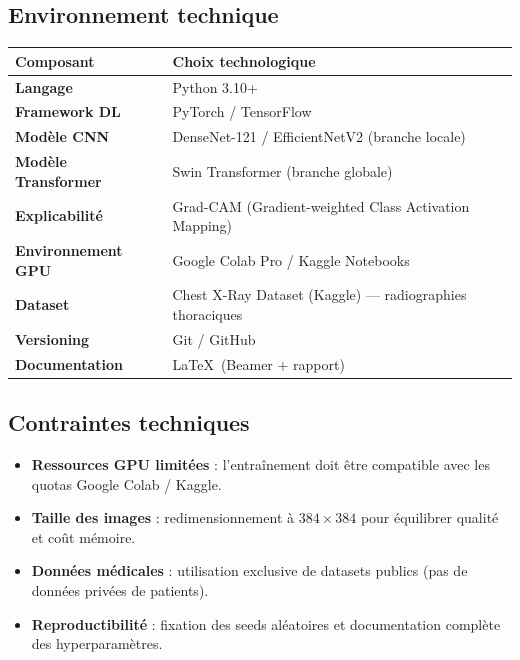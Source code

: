\documentclass[a4paper,12pt]{article}
\begin{document}
\subsection{Environnement technique}

\renewcommand{\arraystretch}{1.35}
\begin{tabularx}{\linewidth}{@{}>{\bfseries}l X@{}}
  \toprule
  \textbf{Composant} & \textbf{Choix technologique} \\
  \midrule
  Langage & Python 3.10+ \\
  \rowcolor{grisClair}
  Framework DL & PyTorch / TensorFlow \\
  Modèle CNN & DenseNet-121 / EfficientNetV2 (branche locale) \\
  \rowcolor{grisClair}
  Modèle Transformer & Swin Transformer (branche globale) \\
  Explicabilité & Grad-CAM (Gradient-weighted Class Activation Mapping) \\
  \rowcolor{grisClair}
  Environnement GPU & Google Colab Pro / Kaggle Notebooks \\
  Dataset & Chest X-Ray Dataset (Kaggle) — radiographies thoraciques \\
  \rowcolor{grisClair}
  Versioning & Git / GitHub \\
  Documentation & \LaTeX\ (Beamer + rapport) \\
  \bottomrule
\end{tabularx}

\subsection{Contraintes techniques}

\begin{itemize}[leftmargin=1.5em, itemsep=4pt]
  \item \textbf{Ressources GPU limitées} : l'entraînement doit être compatible avec les quotas Google Colab / Kaggle.
  \item \textbf{Taille des images} : redimensionnement à $384 \times 384$ pour équilibrer qualité et coût mémoire.
  \item \textbf{Données médicales} : utilisation exclusive de datasets publics (pas de données privées de patients).
  \item \textbf{Reproductibilité} : fixation des seeds aléatoires et documentation complète des hyperparamètres.
\end{itemize}

\newpage
\end{document}
